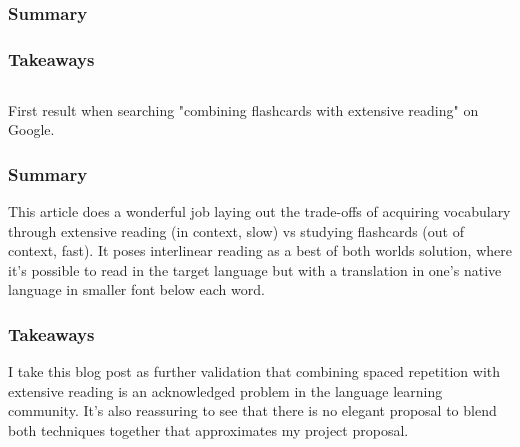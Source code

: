\documentclass[
	letterpaper, %
]{jdf}
\begin{document}
\subsection{}


\subsubsection{Summary}


\subsubsection{Takeaways}

 \subsection{}
First result when searching "combining flashcards with extensive reading" on Google.

\subsubsection{Summary}
This article does a wonderful job laying out the trade-offs of acquiring vocabulary through extensive reading (in context, slow) vs studying flashcards (out of context, fast). It poses interlinear reading as a best of both worlds solution, where it's possible to read in the target language but with a translation in one's native language in smaller font below each word.

\subsubsection{Takeaways}
I take this blog post as further validation that combining spaced repetition with extensive reading is an acknowledged problem in the language learning community. It's also reassuring to see that there is no elegant proposal to blend both techniques together that approximates my project proposal.
\end{document}
